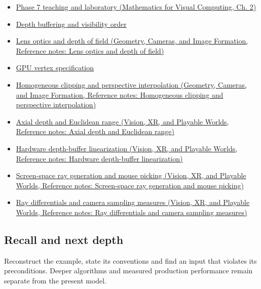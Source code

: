 \begin{itemize}
\item
  \href{../02-Mathematics-for-Visual-Computing/main.pdf\#nameddest=01-foundations-i-ch018-keep-the-promises-visible-while-moving-between-representations}{Phase 7 teaching and laboratory (Mathematics for Visual Computing, Ch. 2)}
\item
  \hyperref[appendix-97578ed97952]{Depth buffering and visibility order}
\item
  \href{../03-Geometry-Cameras-and-Image-Formation/main.pdf\#nameddest=appendix-21f8456e2629}{Lens optics and depth of field (Geometry, Cameras, and Image Formation, Reference notes: Lens optics and depth of field)}
\item
  \hyperref[appendix-749ba51a6c25]{GPU vertex specification}
\item
  \href{../03-Geometry-Cameras-and-Image-Formation/main.pdf\#nameddest=appendix-40426e4b2103}{Homogeneous clipping and perspective interpolation (Geometry, Cameras, and Image Formation, Reference notes: Homogeneous clipping and perspective interpolation)}
\item
  \href{../07-Vision-XR-and-Playable-Worlds/main.pdf\#nameddest=appendix-cac01ebeeb11}{Axial depth and Euclidean range (Vision, XR, and Playable Worlds, Reference notes: Axial depth and Euclidean range)}
\item
  \href{../07-Vision-XR-and-Playable-Worlds/main.pdf\#nameddest=appendix-1bc40b08db4a}{Hardware depth-buffer linearization (Vision, XR, and Playable Worlds, Reference notes: Hardware depth-buffer linearization)}
\item
  \href{../07-Vision-XR-and-Playable-Worlds/main.pdf\#nameddest=appendix-f1a6d43e80d1}{Screen-space ray generation and mouse picking (Vision, XR, and Playable Worlds, Reference notes: Screen-space ray generation and mouse picking)}
\item
  \href{../07-Vision-XR-and-Playable-Worlds/main.pdf\#nameddest=appendix-8c40fad29462}{Ray differentials and camera sampling measures (Vision, XR, and Playable Worlds, Reference notes: Ray differentials and camera sampling measures)}
\end{itemize}

\subsection{Recall and next depth}\label{appendix-1c07d64f5e70-recall-and-next-depth}

Reconstruct the example, state its conventions and find an input that violates its preconditions. Deeper algorithms and measured production performance remain separate from the present model.

